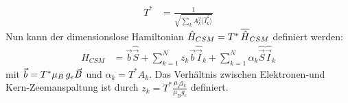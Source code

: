 \begin{align}
    T^* &= \frac{1}{\sqrt{\sum_k A_k^2\langle \hat{I}_k^2 \rangle}}
\end{align}
Nun kann der dimensionslose Hamiltonian $\hat{H}_{CSM} = T^*\thinspace\overline{\hat{H}}_{CSM}$ definiert werden:
\begin{align}
    \hat{H}_{CSM} &= \vec{b}\hat{\vec{S}} +  \sum_{k=1}^{N}z_k\vec{b}\hat{\vec{I}}_k + \sum_{k=1}^{N} \alpha_k \hat{\vec{S}}\hat{\vec{I}}_k
\end{align}
mit $\vec{b}=T^*\mu_B\thinspace g_e \vec{B}$ und $\alpha_k = T^* A_k$. Das Verhältnis zwischen Elektronen-und Kern-Zeemanspaltung ist 
durch $z_k=T^*\frac{\mu_I g_k}{\mu_B g_e}$ definiert.


